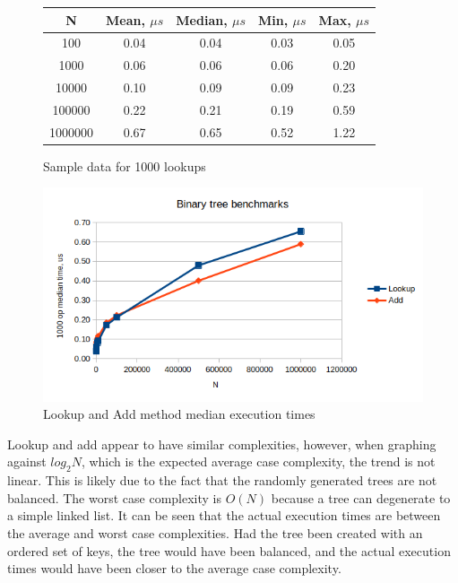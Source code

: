 \documentclass[a4paper,11pt]{article}
\begin{document}
    \begin{figure}[H]
        \centering
        \begin{tabular}{c|c|c|c|c}
            N & Mean, $\mu s$ & Median, $\mu s$ & Min, $\mu s$ & Max, $\mu s$ \\
            \hline
            \hline
            100 & 0.04 & 0.04 & 0.03 & 0.05 \\
            \hline
            1000 & 0.06 & 0.06 & 0.06 & 0.20 \\
            \hline
            10000 & 0.10 & 0.09 & 0.09 & 0.23 \\
            \hline
            100000 & 0.22 & 0.21 & 0.19 & 0.59 \\
            \hline
            1000000 & 0.67 & 0.65 & 0.52 & 1.22 \\
        \end{tabular}

        \caption{Sample data for 1000 lookups}
    \end{figure}

    \begin{figure}[H]
        \centering
        \includegraphics[width=\textwidth]{bt}
        \caption{Lookup and Add method median execution times}
    \end{figure}

    Lookup and add appear to have similar complexities, however, when graphing against $log_2 N$, which is the expected average case complexity, the trend is not linear. This is likely due to the fact that the randomly generated trees are not balanced. The worst case complexity is $O(N)$ because a tree can degenerate to a simple linked list. It can be seen that the actual execution times are between the average and worst case complexities. Had the tree been created with an ordered set of keys, the tree would have been balanced, and the actual execution times would have been closer to the average case complexity.
\end{document}
